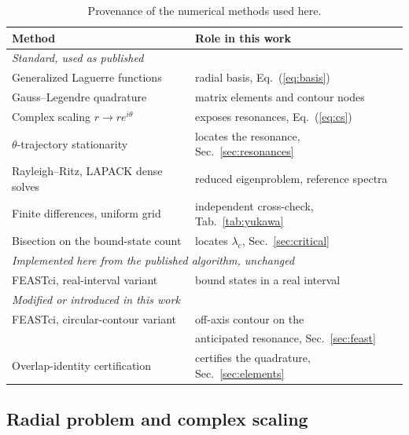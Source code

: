 \documentclass[12pt,twoside]{paper}
\begin{document}
\begin{table}[h]
\caption{Provenance of the numerical methods used here.}
\label{tab:provenance}
\centering
\footnotesize
\renewcommand{\arraystretch}{0.95}
\setlength{\tabcolsep}{4pt}
\begin{tabular}{ll}
\hline
Method & Role in this work \\
\hline
\multicolumn{2}{l}{\emph{Standard, used as published}} \\
Generalized Laguerre functions & radial basis, Eq.~(\ref{eq:basis}) \\
Gauss--Legendre quadrature & matrix elements and contour nodes \\
Complex scaling $r \to re^{i\theta}$ & exposes resonances, Eq.~(\ref{eq:cs}) \\
$\theta$-trajectory stationarity & locates the resonance, Sec.~\ref{sec:resonances} \\
Rayleigh--Ritz, LAPACK dense solves & reduced eigenproblem, reference spectra \\
Finite differences, uniform grid & independent cross-check, Tab.~\ref{tab:yukawa} \\
Bisection on the bound-state count & locates $\lambda_c$, Sec.~\ref{sec:critical} \\
\hline
\multicolumn{2}{l}{\emph{Implemented here from the published algorithm, unchanged}} \\
FEASTci, real-interval variant & bound states in a real interval~\cite{Polizzi2009} \\
\hline
\multicolumn{2}{l}{\emph{Modified or introduced in this work}} \\
FEASTci, circular-contour variant & off-axis contour on the \\
 & anticipated resonance, Sec.~\ref{sec:feast}~\cite{Kestyn2016} \\
Overlap-identity certification & certifies the quadrature, Sec.~\ref{sec:elements} \\
\hline
\end{tabular}
\end{table}

\subsection{Radial problem and complex scaling}
\label{sec:radial}
\end{document}
